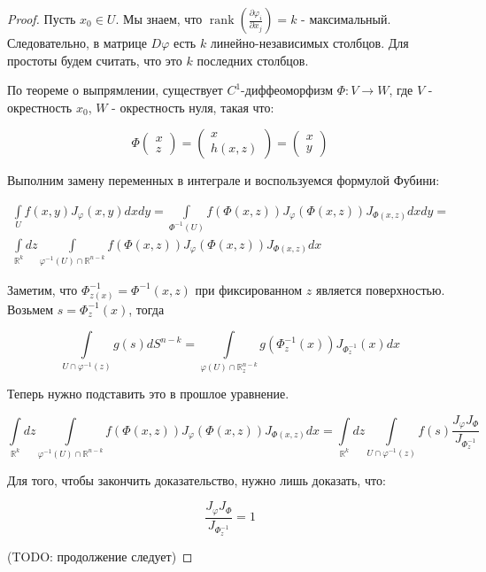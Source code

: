\documentclass[a5paper]{article}
\theoremstyle{plain}
\theoremstyle{definition}
\numberwithin{through}{section}
\numberwithin{equation}{section}
\DeclareMathOperator{\rank}{rank}
\begin{document}
\begin{proof}
	Пусть $x_0 \in U$. Мы знаем, что $\rank (\frac{\partial \varphi_i}{\partial x_j}) = k$ - максимальный. Следовательно, в матрице $D \varphi$ есть $k$ линейно-независимых столбцов. Для простоты будем считать, что это $k$ последних столбцов.
	
	По теореме о выпрямлении, существует $C^1$-диффеоморфизм $\varPhi : V \to W$, где $V$ - окрестность $x_0$, $W$ - окрестность нуля, такая что:
	
	\begin{equation*}
		\varPhi 
		\begin{pmatrix}
			x \\
			z
		\end{pmatrix}
		=
		\begin{pmatrix}
			x \\
			h(x, z)
		\end{pmatrix}
		=
		\begin{pmatrix}
			x \\
			y
		\end{pmatrix}
	\end{equation*}
	
	Выполним замену переменных в интеграле и воспользуемся формулой Фубини:
	
	\begin{align*}
		\int\limits_{U} f(x,y) J_{\varphi} (x, y) dx dy = \int\limits_{\varPhi^{-1}(U)} f(\varPhi (x, z)) J_{\varphi} (\varPhi (x, z)) J_{\varPhi(x, z)} dx dy = \\
		\int\limits_{\mathbb{R}^k} dz \int\limits_{\varphi^{-1}(U) \cap \mathbb{R}^{n-k}} f(\varPhi (x, z)) J_{\varphi} (\varPhi (x, z)) J_{\varPhi(x, z)} dx
	\end{align*}
	
	Заметим, что $\varPhi^{-1}_{z(x)} = \varPhi^{-1}(x, z)$ при фиксированном $z$ является поверхностью. Возьмем $s=\varPhi^{-1}_z(x)$, тогда
	
	\begin{equation*}
		\int\limits_{U \cap \varphi^{-1}(z)} g(s) dS^{n-k} = \int\limits_{\varphi(U) \cap \mathbb{R}^{n-k}_z} g(\varPhi_z^{-1}(x)) J_{\varPhi^{-1}_z}(x) dx
	\end{equation*}
	
	Теперь нужно подставить это в прошлое уравнение.
	
	\begin{equation*}
	\int\limits_{\mathbb{R}^k} dz \int\limits_{\varphi^{-1}(U) \cap \mathbb{R}^{n-k}} f(\varPhi (x, z)) J_{\varphi} (\varPhi (x, z)) J_{\varPhi(x, z)} dx = \int\limits_{\mathbb{R}^k} dz \int\limits_{U \cap \varphi^{-1}(z)} f(s) \frac{J_{\varphi} J_{\varPhi}}{J_{\varPhi^{-1}_z}}
	\end{equation*}
	
	Для того, чтобы закончить доказательство, нужно лишь доказать, что:
	
	\begin{equation*}
		\frac{J_{\varphi} J_{\varPhi}}{J_{\varPhi^{-1}_z}} = 1
	\end{equation*}
	
	(TODO: продолжение следует)
\end{proof}
\end{document}
